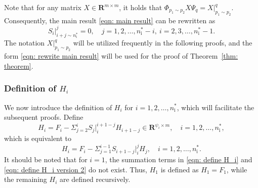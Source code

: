 \documentclass[sort&compress]{elsarticle}
\newcommand\nsharp{n_\mathrm i^*}
\newcommand\R{\mathbf R}
\newcommand\PHi{\mathit\Phi}
\newcommand\PSi{\mathit\Psi}
\begin{document}
Note that for any matrix $X \in \R^{m \times m}$,
it holds that $\PHi_{p_1\sim p_2} X \PSi_{q} = X|_{p_1\sim p_2}^{q}$.
Consequently, the main result \eqref{eqn: main result} can be rewritten as
\begin{equation}\label{eqn: rewrite main result}
S_i|_{i+j\sim \nsharp}^j=0,\quad
j=1,2,\dots,\nsharp-i,\
i=2,3,\dots,\nsharp-1.
\end{equation}
The notation $X|_{p_1\sim p_2}^{q}$ will be utilized frequently in the following proofs,
and the form \eqref{eqn: rewrite main result} will be used for the proof of Theorem~\ref{thm: theorem}.

\subsubsection{Definition of $H_i$}

We now introduce the definition of $H_i$ for $i=1,2,\dots,\nsharp$, which
will facilitate the subsequent proofs.
Define
\begin{equation}\label{eqn: define H_i}
H_i = F_i - \Sigma_{j=2}^i S_j|_i^{i+1-j} H_{i+1-j}
\in \R^{\psi_i\times m},
\quad i=1,2,\dots,\nsharp,
\end{equation}
which is equivalent to
\begin{equation}\label{eqn: define H_i version 2}
H_i = F_i - \Sigma_{j=1}^{i-1} S_{i+1-j}|_i^j H_j,
\quad i=1,2,\dots,\nsharp.
\end{equation}
It should be noted that for $i=1$, the summation terms
in \eqref{eqn: define H_i} and \eqref{eqn: define H_i version 2} do not exist.
Thus, $H_1$ is defined as $H_1 = F_1$,
while the remaining $H_i$ are defined recursively.
\end{document}
